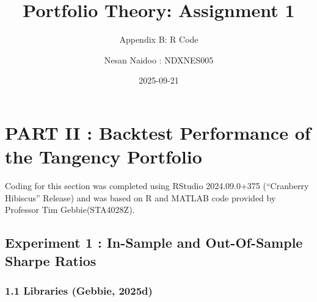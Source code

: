 \documentclass[
  12pt,
]{article}
\title{Portfolio Theory: Assignment 1}
\subtitle{Appendix B: R Code}
\author{Nesan Naidoo : NDXNES005}
\date{2025-09-21}
\newenvironment{Shaded}{\begin{snugshade}}{\end{snugshade}}
\newcommand{\AttributeTok}[1]{\textcolor[rgb]{0.13,0.29,0.53}{#1}}
\newcommand{\ConstantTok}[1]{\textcolor[rgb]{0.56,0.35,0.01}{#1}}
\newcommand{\DecValTok}[1]{\textcolor[rgb]{0.00,0.00,0.81}{#1}}
\newcommand{\FunctionTok}[1]{\textcolor[rgb]{0.13,0.29,0.53}{\textbf{#1}}}
\newcommand{\NormalTok}[1]{#1}
\newcommand{\SpecialCharTok}[1]{\textcolor[rgb]{0.81,0.36,0.00}{\textbf{#1}}}
\begin{document}
\maketitle

\section{PART II : Backtest Performance of the Tangency
Portfolio}\label{part-ii-backtest-performance-of-the-tangency-portfolio}

Coding for this section was completed using RStudio 2024.09.0+375
(``Cranberry Hibiscus'' Release) and was based on R and MATLAB code
provided by Professor Tim Gebbie(STA4028Z).

\subsection{Experiment 1 : In-Sample and Out-Of-Sample Sharpe
Ratios}\label{experiment-1-in-sample-and-out-of-sample-sharpe-ratios}

\subsubsection{1.1 Libraries (Gebbie, 2025d)}\label{libraries-tim_prep}

\begin{Shaded}
\end{Shaded}
\end{document}
